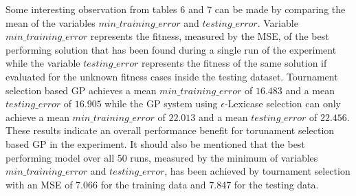 \documentclass[
  12pt,
]{article}
\begin{document}
\begin{table}[!h]

\caption{\label{tab:unnamed-chunk-7}Summary - Epsilon-Lexicase Selection}
\centering
{}
\end{table}

Some interesting observation from tables 6 and 7 can be made by
comparing the mean of the variables \(min\_training\_error\) and
\(testing\_error\). Variable \(min\_training\_error\) represents the
fitness, measured by the MSE, of the best performing solution that has
been found during a single run of the experiment while the variable
\(testing\_error\) represents the fitness of the same solution if
evaluated for the unknown fitness cases inside the testing dataset.
Tournament selection based GP achieves a mean \(min\_training\_error\)
of \(16.483\) and a mean \(testing\_error\) of \(16.905\) while the GP
system using \(\epsilon\)-Lexicase selection can only achieve a mean
\(min\_training\_error\) of \(22.013\) and a mean \(testing\_error\) of
\(22.456\). These results indicate an overall performance benefit for
torunament selection based GP in the experiment. It should also be
mentioned that the best performing model over all 50 runs, measured by
the minimum of variables \(min\_training\_error\) and
\(testing\_error\), has been achieved by tournament selection with an
MSE of 7.066 for the training data and 7.847 for the testing data.
\end{document}
